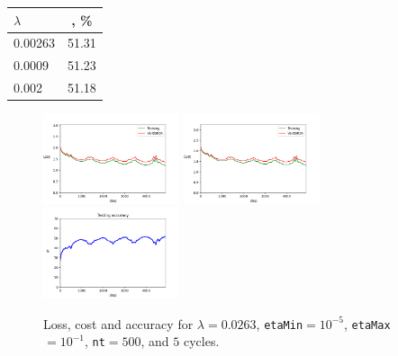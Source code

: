 \documentclass{article}
\begin{document}
	\begin{center}	
	\begin{tabular}{|l|c|}
		\hline
		 $\lambda$ & \text{Accuracy}, \% \\ \hline
		0.00263 & 51.31\\ 
		0.0009 & 51.23\\
		0.002 	& 51.18\\\hline
	\end{tabular}
	\end{center}
	\begin{figure}[!h]
		\centering
		\includegraphics[width=4cm]{../plots/loss_top_v1.png}
		\includegraphics[width=4cm]{../plots/cost_top_v1.png}
		\includegraphics[width=4cm]{../plots/acc_top_v1.png}
		\caption{Loss, cost and accuracy for $\lambda=0.0263$, \texttt{etaMin}$=10^{-5}$, \texttt{etaMax}$=10^{-1}$, \texttt{nt}$=500$, and $5$ cycles.}
	\end{figure}
\end{document}
